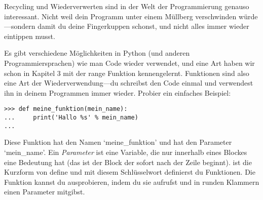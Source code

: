 Recycling und Wiederverwerten sind in der Welt der Programmierung genauso interessant. Nicht weil dein Programm unter einem Müllberg verschwinden würde---sondern damit du deine Fingerkuppen schonst, und nicht alles immer wieder eintippen musst.

Es gibt verschiedene Möglichkeiten in Python (und anderen Programmiersprachen) wie man Code wieder verwendet, und eine Art haben wir schon in Kapitel 3 mit der range Funktion kennengelernt. Funktionen sind also eine Art der Wiederverwendung---du schreibst den Code einmal und verwendest ihn in deinem Programmen immer wieder. Probier ein einfaches Beispiel:

\begin{Verbatim}[frame=single]
>>> def meine_funktion(mein_name):
...     print('Hallo %s' % mein_name)
...
\end{Verbatim}


Diese Funktion hat den Namen `meine\_funktion' und hat den Parameter `mein\_name'. Ein \emph{Parameter} ist eine Variable, die nur innerhalb eines Blockes eine Bedeutung hat (das ist der Block der sofort nach der  Zeile beginnt).  ist die Kurzform von define und mit diesem Schlüsselwort definierst du Funktionen. Die Funktion kannst du ausprobieren, indem du sie aufrufst und in runden Klammern einen Parameter mitgibst.

